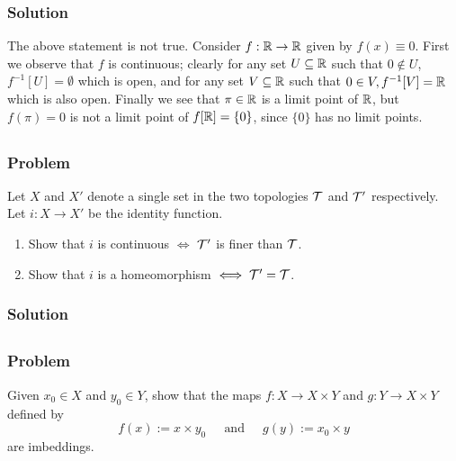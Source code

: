 \subsubsection{Solution}
The above statement is not true. Consider $f : \mathbb R \to \mathbb R$ given by $f(x) \equiv 0$. First we observe that $f$ is continuous; clearly for any set $U \subseteq \mathbb R$ such that $0 \not\in U$, $f^{-1}[U] = \emptyset$ which is open, and for any set $V \subseteq \mathbb R$ such that $0 \in V, f^{-1}[V] = \mathbb R$ which is also open. Finally we see that $\pi \in \mathbb R$ is a limit point of $\mathbb R$, but $f(\pi) = 0$ is not a limit point of $f[\mathbb R] = \{0\}$, since $\{0\}$ has no limit points.


\subsection{}

\subsubsection{Problem}
Let $X$ and $X'$ denote a single set in the two topologies $\mathcal T$ and $\mathcal T'$ respectively. Let $i : X \to X'$ be the identity function. 
\begin{enumerate}
    \item Show that $i$ is continuous $\iff$ $\mathcal T'$ is finer than $\mathcal T$.
    \item Show that $i$ is a homeomorphism $\iff \mathcal T' = \mathcal T$.
\end{enumerate}

\subsubsection{Solution}
\todo


\subsection{}

\subsubsection{Problem}
Given $x_0 \in X$ and $y_0 \in Y$, show that the maps $f : X \to X \times Y$ and $g : Y \to X \times Y$ defined by
\[ f(x) := x \times y_0 ~~~~~\mbox{ and }~~~~~ g(y) := x_0 \times y \]
are imbeddings.

